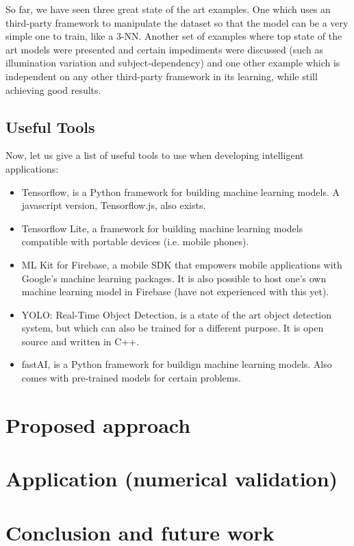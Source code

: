 \documentclass[runningheads,a4paper,11pt]{report}
\begin{document}
So far, we have seen three great state of the art examples. One which uses an third-party framework to manipulate the dataset so that the model can be a very simple one to train, like a 3-NN. Another set of examples where top state of the art models were presented and certain impediments were discussed (such as illumination variation and subject-dependency) and one other example which is independent on any other third-party framework in its learning, while still achieving good results.


\section{Useful Tools}
\label{section:ut}


Now, let us give a list of useful tools to use when developing intelligent applications:
\begin{itemize}
	\item Tensorflow, is a Python framework for building machine learning models. A javascript version, Tensorflow.js, also exists.
	\item Tensorflow Lite, a framework for building machine learning models compatible with portable devices (i.e. mobile phones).
	\item ML Kit for Firebase, a mobile SDK that empowers mobile applications with Google's machine learning packages. It is also possible to host one's own machine learning model in Firebase (have not experienced with this yet).
	\item YOLO: Real-Time Object Detection, is a state of the art object detection system, but which can also be trained for a different purpose. It is open source and written in C++.
	\item fastAI, is a Python framework for buildign machine learning models. Also comes with pre-trained models for certain problems.
\end{itemize}



\chapter{Proposed approach}
\label{chapter:proposedApproach}


\chapter{Application (numerical validation)}
\label{chapter:application}



\chapter{Conclusion and future work}
\label{chapter:concl}




\end{document}
